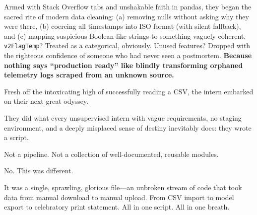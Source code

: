 Armed with Stack Overflow tabs and unshakable faith in pandas, they began the sacred rite of modern data cleaning: (a) removing nulls without asking why they were there, (b) coercing all timestamps into ISO format (with silent fallback), and (c) mapping suspicious Boolean-like strings to something vaguely coherent. \texttt{v2FlagTemp}? Treated as a categorical, obviously. Unused features? Dropped with the righteous confidence of someone who had never seen a postmortem. \textbf{Because nothing says “production ready” like blindly transforming orphaned telemetry logs scraped from an unknown source.}

Fresh off the intoxicating high of successfully reading a CSV, the intern embarked on their next great odyssey.

They did what every unsupervised intern with vague requirements, no staging environment, and a deeply misplaced sense of destiny inevitably does: they wrote a script.

Not a pipeline. Not a collection of well-documented, reusable modules.

No. This was different.

It was a single, sprawling, glorious file—an unbroken stream of code that took data from manual download to manual upload. From CSV import to model export to celebratory print statement. All in one script. All in one breath.


